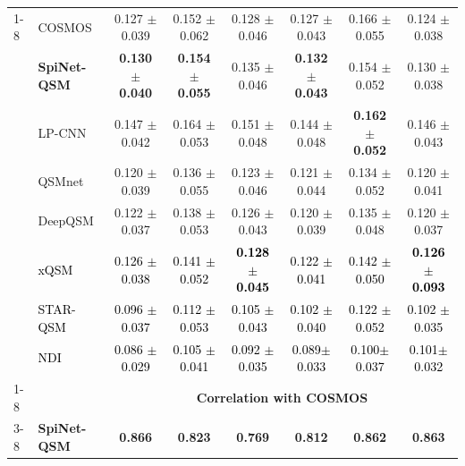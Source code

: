 \documentclass[sn-vancouver,Numbered]{sn-jnl}%
\begin{document}
\begin{table}[htbp]
{\begin{tabular}{llcccccc}
\cmidrule{1-8}


\multirow{5}{*}{GP}        
& COSMOS   
&0.127 $\pm$ 0.039
&0.152 $\pm$ 0.062
&0.128 $\pm$ 0.046
&0.127 $\pm$ 0.043
&0.166 $\pm$ 0.055
&0.124 $\pm$ 0.038
\\ 

& \textbf{SpiNet-QSM}   
&\textbf{0.130 $\pm$ 0.040}
&\textbf{0.154 $\pm$ 0.055}
&0.135 $\pm$ 0.046
&\textbf{0.132 $\pm$ 0.043}
&0.154 $\pm$ 0.052
&0.130 $\pm$ 0.038 \\ 

& LP-CNN                
&0.147 $\pm$ 0.042
&0.164 $\pm$ 0.053
&0.151 $\pm$ 0.048
&0.144 $\pm$ 0.048
&\textbf{0.162 $\pm$ 0.052}
&0.146 $\pm$ 0.043\\ 

& QSMnet                
&0.120 $\pm$ 0.039
&0.136 $\pm$ 0.055
&0.123 $\pm$ 0.046
&0.121 $\pm$ 0.044
&0.134 $\pm$ 0.052
&0.120 $\pm$ 0.041\\ 

& DeepQSM               
&0.122 $\pm$ 0.037
&0.138 $\pm$ 0.053
&0.126 $\pm$ 0.043
&0.120 $\pm$ 0.039
&0.135 $\pm$ 0.048
&0.120 $\pm$ 0.037 \\ 

&\textcolor{black}{xQSM}               
&\textcolor{black}{0.126 $\pm$ 0.038}
&\textcolor{black}{0.141 $\pm$ 0.052}
&\textcolor{black}{\textbf{0.128 $\pm$ 0.045}}
&\textcolor{black}{0.122 $\pm$ 0.041}
&\textcolor{black}{0.142 $\pm$ 0.050}
&\textcolor{black}{\textbf{0.126 $\pm$ 0.093}}\\

&\textcolor{black}{STAR-QSM}               
&\textcolor{black}{0.096 $\pm$ 0.037}
&\textcolor{black}{0.112 $\pm$ 0.053}
&\textcolor{black}{0.105 $\pm$ 0.043}
&\textcolor{black}{0.102 $\pm$ 0.040}
&\textcolor{black}{0.122 $\pm$ 0.052}
&\textcolor{black}{0.102 $\pm$ 0.035} \\ 


&\textcolor{black}{NDI}               
&\textcolor{black}{0.086 $\pm$ 0.029}
&\textcolor{black}{0.105 $\pm$ 0.041}
&\textcolor{black}{0.092 $\pm$ 0.035}
&\textcolor{black}{0.089$\pm$ 0.033}
&\textcolor{black}{0.100$\pm$ 0.037}
&\textcolor{black}{0.101$\pm$ 0.032}\\



\cmidrule{1-8}



& &\multicolumn{6}{c}{\textbf{Correlation with COSMOS}} \\ 
\cmidrule{3-8}

\multirow{5}{*}{CAU}        
& \textbf{SpiNet-QSM}   
&\textbf{0.866}
&\textbf{0.823}
&\textbf{0.769}
&\textbf{0.812}
&\textbf{0.862}
&\textbf{0.863} \\ 


\end{tabular}}
\end{table}
\end{document}
